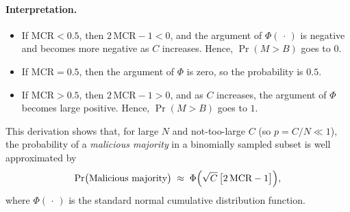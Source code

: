 \paragraph{Interpretation.}
\begin{itemize}
    \item If $\text{MCR} < 0.5$, then $2\,\text{MCR} - 1 < 0$, and the argument of $\Phi(\,\cdot\,)$ is negative and becomes more negative as $C$ increases. Hence, $\Pr(M > B)$ goes to $0$.
    \item If $\text{MCR} = 0.5$, then the argument of $\Phi$ is zero, so the probability is $0.5$.
    \item If $\text{MCR} > 0.5$, then $2\,\text{MCR} - 1 > 0$, and as $C$ increases, the argument of $\Phi$ becomes large positive. Hence, $\Pr(M > B)$ goes to $1$.
\end{itemize}

This derivation shows that, for large $N$ and not-too-large $C$ (so $p = C/N \ll 1$), the probability of a \emph{malicious majority} in a binomially sampled subset is well approximated by
\[
    \Pr\bigl(\text{Malicious majority}\bigr)
    \;\approx\;
    \Phi\Bigl(\sqrt{C}\,\bigl[2\,\text{MCR} - 1\bigr]\Bigr),
\]
where $\Phi(\,\cdot\,)$ is the standard normal cumulative distribution function.

